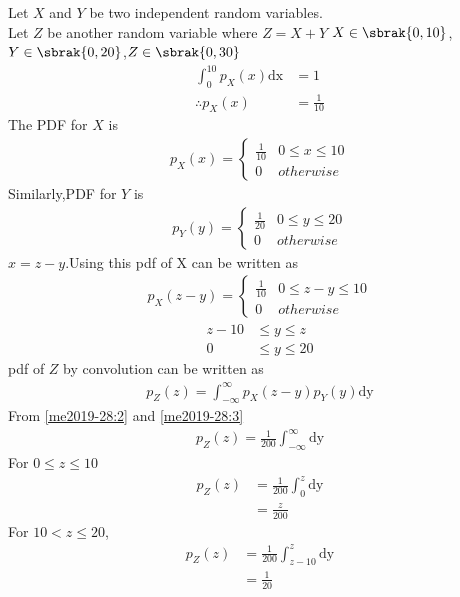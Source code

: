 
Let $X$ and $Y$ be two independent random variables. \\
Let $Z$ be another random variable where $Z=X+Y$
$X \in \sbrak{0,10}$,$Y \in \sbrak{0,20}$,$Z \in \sbrak{0,30}$
\begin{align}
\int_{0}^{10} p_X(x) \mathrm{dx} &=1  \\
\therefore p_X(x)&=\frac{1}{10} \label{me2019-28:px}
\end{align}
The PDF for $X$ is
\begin{align}
p_X(x)  = 
\begin{cases}
     \frac{1}{10} & 0 \leq x \leq 10\\
     0 & otherwise \label{me2019-28:1}
\end{cases}
\end{align}
Similarly,PDF for $Y$ is
\begin{align}
p_{Y}(y)  = 
\begin{cases}
     \frac{1}{20} & 0 \leq y \leq 20 \\
      0 & otherwise \label{me2019-28:2}
\end{cases}
\end{align}
$x=z-y$.Using this pdf of X can be written as
\begin{align}
p_X(z-y)  = 
\begin{cases}
    \frac{1}{10} & 0 \leq z-y \leq 10\\
    0 & otherwise \label{me2019-28:3}
\end{cases}
\end{align}
\begin{align}
   z-10 &\leq y \leq z \label{me2019-28:4} \\
   0 &\leq y \leq 20 \label{me2019-28:5}
\end{align}
pdf of $Z$ by convolution can be written as
\begin{align}
 p_Z(z) =  \int_{- \infty}^{\infty} p_X(z-y)p_Y(y) \mathrm{dy} \label{me2019-28:pz}
\end{align}
From \ref{me2019-28:2} and \ref{me2019-28:3}
\begin{align}
 p_Z(z) = \frac{1}{200} \int_{- \infty}^{\infty} \mathrm{dy} \label{me2019-28:6}
\end{align}
For $0 \leq z \leq 10$  
\begin{align}
p_Z(z) &= \frac{1}{200}  \int_{0}^{z}\mathrm{dy}  \\
       &= \frac{z}{200} \label{me2019-28:7}
\end{align}
For $ 10 < z \leq 20 $,
\begin{align}
p_Z(z) &= \frac{1}{200}  \int_{z-10}^{z}\mathrm{dy}  \\
        &= \frac{1}{20} \label{me2019-28:8}
\end{align}

